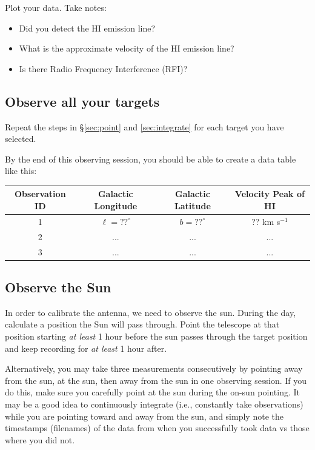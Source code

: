\documentclass[11pt]{article}
\begin{document}
Plot your data.  Take notes:
\begin{itemize}
    \item Did you detect the HI emission line?
    \item What is the approximate velocity of the HI emission line?
    \item Is there Radio Frequency Interference (RFI)?
\end{itemize}

\subsection{Observe all your targets}

Repeat the steps in \S \ref{sec:point} and \ref{sec:integrate} for each target you have selected.

By the end of this observing session, you should be able to create a data table like this:

\begin{tabular}{|c|c|c|c|}
\hline
 Observation ID &   Galactic Longitude & Galactic Latitude & Velocity Peak of HI \\
\hline
 1  & $\ell= ?? ^\circ$ & $b= ?? ^\circ$ & ?? km s$^{-1}$ \\
 \hline
 2  & ... & ... & ... \\
 \hline
 3  & ... & ... & ... \\
 \hline
\end{tabular}

\subsection{Observe the Sun}
In order to calibrate the antenna, we need to observe the sun.  During the day,
calculate a position the Sun will pass through.  Point the telescope at that
position starting \emph{at least} 1 hour before the sun passes through the
target position and keep recording for \emph{at least} 1 hour after.


Alternatively, you may take three measurements consecutively by pointing away
from the sun, at the sun, then away from the sun in one observing session.  If
you do this, make sure you carefully point at the sun during the on-sun
pointing.  It may be a good idea to continuously integrate (i.e., constantly
take observations) while you are pointing toward and away from the sun, and
simply note the timestamps (filenames) of the data from when you successfully
took data vs those where you did not.
\end{document}
